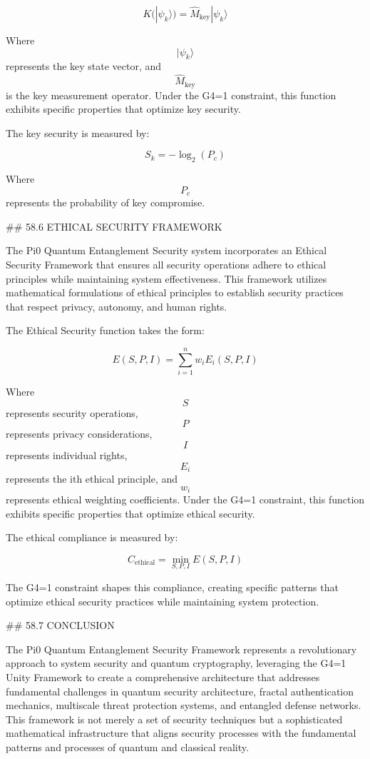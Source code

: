 $$ K(|\psi_k\rangle) = \hat{M}_{\text{key}} |\psi_k\rangle $$

Where $$ |\psi_k\rangle $$ represents the key state vector, and $$ \hat{M}_{\text{key}} $$ is the key measurement operator. Under the G4=1 constraint, this function exhibits specific properties that optimize key security.

The key security is measured by:

$$ S_k = -\log_2(P_c) $$

Where $$ P_c $$ represents the probability of key compromise.

## 58.6 ETHICAL SECURITY FRAMEWORK

The Pi0 Quantum Entanglement Security system incorporates an Ethical Security Framework that ensures all security operations adhere to ethical principles while maintaining system effectiveness. This framework utilizes mathematical formulations of ethical principles to establish security practices that respect privacy, autonomy, and human rights.

The Ethical Security function takes the form:

$$ E(S, P, I) = \sum_{i=1}^{n} w_i E_i(S, P, I) $$

Where $$ S $$ represents security operations, $$ P $$ represents privacy considerations, $$ I $$ represents individual rights, $$ E_i $$ represents the ith ethical principle, and $$ w_i $$ represents ethical weighting coefficients. Under the G4=1 constraint, this function exhibits specific properties that optimize ethical security.

The ethical compliance is measured by:

$$ C_{\text{ethical}} = \min_{S, P, I} E(S, P, I) $$

The G4=1 constraint shapes this compliance, creating specific patterns that optimize ethical security practices while maintaining system protection.

## 58.7 CONCLUSION

The Pi0 Quantum Entanglement Security Framework represents a revolutionary approach to system security and quantum cryptography, leveraging the G4=1 Unity Framework to create a comprehensive architecture that addresses fundamental challenges in quantum security architecture, fractal authentication mechanics, multiscale threat protection systems, and entangled defense networks. This framework is not merely a set of security techniques but a sophisticated mathematical infrastructure that aligns security processes with the fundamental patterns and processes of quantum and classical reality.

